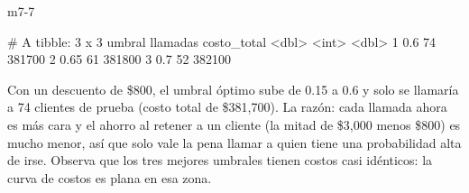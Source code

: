 \begin{solucion}{m7-7}
\begin{rsalida}
# A tibble: 3 x 3
  umbral llamadas costo_total
   <dbl>    <int>       <dbl>
1   0.6        74      381700
2   0.65       61      381800
3   0.7        52      382100
\end{rsalida}

Con un descuento de \$800, el umbral óptimo sube de 0.15 a 0.6 y solo se
llamaría a 74 clientes de prueba (costo total de \$381{,}700). La razón: cada
llamada ahora es más cara y el ahorro al retener a un cliente (la mitad de
\$3{,}000 menos \$800) es mucho menor, así que solo vale la pena llamar a
quien tiene una probabilidad alta de irse. Observa que los tres mejores
umbrales tienen costos casi idénticos: la curva de costos es plana en esa
zona.
\end{solucion}

